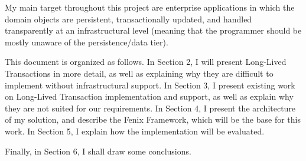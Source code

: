 My main target throughout this project are enterprise applications in
which the domain objects are persistent, transactionally updated, and
handled transparently at an infrastructural level (meaning that the
programmer should be mostly unaware of the persistence/data tier).

This document is organized as follows. In Section 2, I will present
Long-Lived Transactions in more detail, as well as explaining why they
are difficult to implement without infrastructural support. In Section
3, I present existing work on Long-Lived Transaction implementation
and support, as well as explain why they are not suited for our
requirements. In Section 4, I present the architecture of my solution,
and describe the Fenix Framework, which will be the base for this
work. In Section 5, I explain how the implementation will be
evaluated. 

Finally, in Section 6, I shall draw some conclusions.


